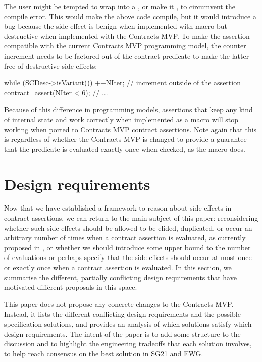 The user might be tempted to wrap  into a , or make it , to circumvent the compile error. This would make the above code compile, but it would introduce a bug because the side effect is benign when implemented with macro  but destructive when implemented with the Contracts MVP. To make the assertion compatible with the current Contracts MVP programming model, the counter increment needs to be factored out of the contract predicate to make the latter free of destructive side effects:
\begin{codeblock}
  while (SCDesc->isVariant()) {
    ++NIter; // increment outside of the assertion
    contract_assert(NIter < 6); 
    // ...
  }
\end{codeblock}
Because of this difference in programming models, assertions that keep any kind of internal state and work correctly when implemented as a macro  will stop working when ported to Contracts MVP contract assertions. Note again that this is regardless of whether the Contracts MVP is changed to provide a guarantee that the predicate is evaluated exactly once when checked, as the  macro does.



\section{Design requirements}
\label{sec:reqs}

Now that we have established a framework to reason about side effects in contract assertions, we can return to the main subject of this paper: reconsidering whether such side effects should be allowed to be elided, duplicated, or occur an arbitrary number of times when a contract assertion is evaluated, as currently proposed in \cite{P2900R6}, or whether we should introduce some upper bound to the number of evaluations or perhaps specify that the side effects should occur at most once or exactly once when a contract assertion is evaluated. In this section, we summarise the different, partially conflicting design requirements that have motivated different proposals in this space.

This paper does not propose any concrete changes to the Contracts MVP. Instead, it lists the different conflicting design requirements and the possible specification solutions, and provides an analysis of which solutions satisfy which design requirements. The intent of the paper is to add some structure to the discussion and to highlight the engineering tradeoffs that each solution involves, to help reach consensus on the best solution in SG21 and EWG.

